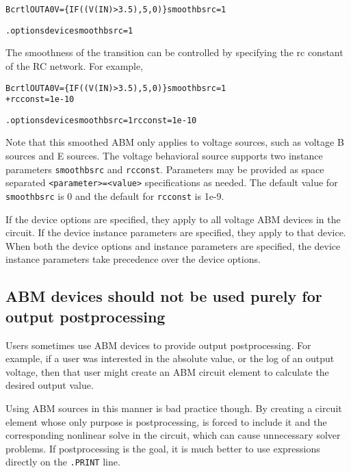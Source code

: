 \begin{alltt} Bcrtl OUTA 0 V=\{ IF( (V(IN) > 3.5), 5, 0 ) \} smoothbsrc=1 \end{alltt}

\begin{alltt} .options device  smoothbsrc=1 \end{alltt}

The smoothness of the transition can be controlled by specifying the
rc constant of the RC network. For example,

\begin{alltt} Bcrtl OUTA 0 V=\{ IF( (V(IN) > 3.5), 5, 0 ) \} smoothbsrc=1   
 + rcconst = 1e-10 \end{alltt}

     
\begin{alltt} .options device  smoothbsrc=1 rcconst = 1e-10 \end{alltt}

Note that this smoothed ABM only applies to voltage sources, such as voltage
B sources and E sources. The voltage behavioral source supports two instance
parameters \texttt{smoothbsrc} and \texttt{rcconst}. Parameters may be provided
as space  separated \texttt{<parameter>=<value>} specifications as needed. The
default value for \texttt{smoothbsrc} is 0 and the default for \texttt{rcconst}
is 1e-9.

If the device options are specified, they apply to all voltage ABM devices in
the circuit. If the device instance parameters are specified, they apply to that
device. When both the device options and instance parameters are specified, the
device instance parameters take precedence over the device options.


\subsection{ABM devices should not be used purely for output postprocessing}

Users sometimes use ABM devices to provide output postprocessing. For
example, if a user was interested in the absolute value, or the log of
an output voltage, then that user might create an ABM circuit element to
calculate the desired output value.

Using ABM sources in this manner is bad practice though. By creating a
circuit element whose only purpose is postprocessing, \Xyce{} is forced
to include it and the corresponding nonlinear solve in the circuit,
which can cause unnecessary solver problems. If postprocessing is the
goal, it is much better to use expressions directly on the
\verb|.PRINT| line.


